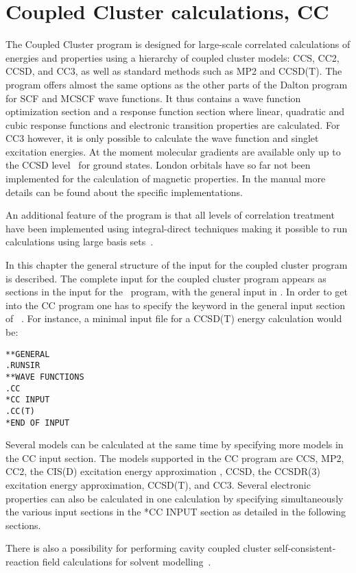 \chapter{Coupled Cluster calculations, CC}\label{ch:CC}

The Coupled Cluster program {\cc} is designed for large-scale
correlated calculations of energies and properties using a
hierarchy of coupled cluster models: CCS, CC2, CCSD, and CC3, as well as standard methods such as MP2 and CCSD(T).
The program offers almost the same options as the other
parts of the Dalton program for SCF and MCSCF wave functions.
It thus contains a wave function optimization section and 
a response function section
where linear, quadratic and cubic response functions and electronic
transition properties are calculated.
For CC3 however, it is only possible to calculate the wave function and 
singlet excitation energies.
At the moment molecular gradients are available 
only up to the CCSD level~\cite{} for ground states.  
London orbitals have so far not been implemented 
for the calculation of magnetic
properties.
In the manual more details can be found about the specific implementations.

An additional feature of the program is that all levels of correlation
treatment have been implemented using integral-direct techniques making
it possible to run calculations using large basis
sets~\cite{}.

In this chapter the general structure of the input for the
coupled cluster program is described.
The complete input for the coupled cluster program appears as
sections in the input for the \sir\ program, with the general
input in . In order to get into the CC program
one has to specify the  keyword in the general input
section of \sir\ . For instance, a minimal
input file for a CCSD(T) energy calculation would be:
\begin{verbatim}
**GENERAL
.RUNSIR
**WAVE FUNCTIONS
.CC
*CC INPUT
.CC(T)
*END OF INPUT
\end{verbatim}

Several models can be calculated at the same time by specifying more models
in the CC input section. 
The models supported in the CC program are 
CCS\cite{Christiansen:CPL243},
MP2\cite{Moller34},
CC2\cite{Christiansen:CPL243},
the CIS(D) excitation energy approximation \cite{Head-Gordon:94},
CCSD\cite{Purvis82},
the CCSDR(3) excitation energy approximation\cite{Christiansen:PERTURBATIVE_TRIPLES}, 
CCSD(T)\cite{Raghavachari89}, and CC3\cite{Christiansen:JCP103,Koch:JCP106}.
Several electronic properties can also 
be calculated in one calculation by specifying simultaneously 
the various input sections in the *CC INPUT section
as detailed in the following sections.

There is also a possibility for performing cavity coupled cluster
self-consistent-reaction field calculations for solvent modelling~\cite{}.
